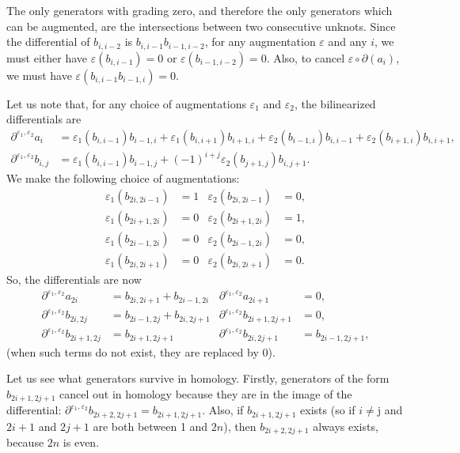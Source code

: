 \documentclass[11pt]{amsart}
\theoremstyle{plain}
\theoremstyle{remark}
\numberwithin{equation}{section}
\begin{document}
The only generators with grading zero, and therefore the only generators which can be augmented, are the intersections between two consecutive unknots. Since the differential of $b_{i,i-2}$ is $b_{i, i-1}b_{i-1,i-2}$, for any augmentation $\varepsilon$ and any $i$, we must either have $\varepsilon(b_{i, i-1})=0$ or $\varepsilon(b_{i-1,i-2})=0$. Also, to cancel $\varepsilon\circ\partial (a_i)$, we must have $\varepsilon(b_{i,i-1}b_{i-1,i})=0$.

Let us note that, for any choice of augmentations $\varepsilon_1$ and $\varepsilon_2$, the bilinearized differentials are 
\begin{align*} \partial^{\varepsilon_1, \varepsilon_2} a_i &= \varepsilon_1(b_{i, i-1})b_{i-1,i} + \varepsilon_1(b_{i,i+1})b_{i+1, i} + \varepsilon_2(b_{i-1,i})b_{i, i-1} + \varepsilon_2(b_{i+1, i})b_{i, i+1},\\
\partial^{\varepsilon_1, \varepsilon_2} b_{i,j} &= \varepsilon_1(b_{i, i-1})b_{i-1,j} +(-1)^{i+j} \varepsilon_2(b_{j+1, j})b_{i, j+1}.\end{align*}
We make the following choice of augmentations:
\begin{align*}\varepsilon_1(b_{2i, 2i-1})&=1 & \varepsilon_2(b_{2i, 2i-1})&=0 ,\\
\varepsilon_1(b_{2i+1, 2i}) &= 0 & \varepsilon_2(b_{2i+1, 2i}) &= 1,\\
\varepsilon_1(b_{2i-1, 2i}) &= 0 & \varepsilon_2(b_{2i-1, 2i}) &= 0,\\
\varepsilon_1(b_{2i, 2i+1}) &= 0 & \varepsilon_2(b_{2i, 2i+1}) &= 0.\end{align*}
So, the differentials are now 
\begin{equation}\label{eq:computation_diff}\begin{aligned} 
\partial^{\varepsilon_1, \varepsilon_2} a_{2i} &= b_{2i,2i+1} + b_{2i-1,2i}& \partial^{\varepsilon_1, \varepsilon_2}a_{2i+1} &= 0, \\
\partial^{\varepsilon_1, \varepsilon_2} b_{2i,2j} &= b_{2i-1,2j} + b_{2i, 2j+1} & \partial^{\varepsilon_1, \varepsilon_2} b_{2i+1,2j+1} &= 0, \\
 \partial^{\varepsilon_1, \varepsilon_2} b_{2i+1,2j} &= b_{2i+1,2j+1}& \partial^{\varepsilon_1, \varepsilon_2} b_{2i,2j+1} &= b_{2i-1,2j+1},
\end{aligned}\end{equation}
(when such terms do not exist, they are replaced by 0).

Let us see what generators survive in homology. Firstly, generators of the form $b_{2i+1,2j+1}$ cancel out in homology because they are in the image of the differential: $\partial^{\varepsilon_1, \varepsilon_2} b_{2i+2,2j+1} = b_{2i+1,2j+1}$. Also, if $b_{2i+1,2j+1}$ exists (so if $i\neq$j and $2i+1$ and $2j+1$ are both between 1 and $2n$), then $b_{2i+2,2j+1}$ always exists, because $2n$ is even. 
\end{document}
